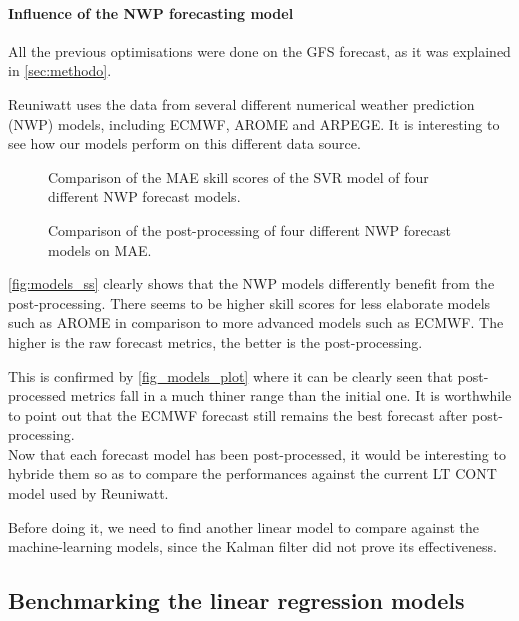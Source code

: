 \paragraph{Influence of the NWP forecasting model}
All the previous optimisations were done on the GFS forecast, as it was explained in \autoref{sec:methodo}.

Reuniwatt uses the data from several different numerical weather prediction (NWP) models, including ECMWF, AROME and ARPEGE.
It is interesting to see how our models perform on this different data source.
\begin{figure}[htb!]
    \centering
    
    \caption{Comparison of the MAE skill scores of the SVR model of four different NWP forecast models.}
    \label{fig:models_ss}   
\end{figure}

\begin{figure}[htb!]
    \centering
    
\caption{Comparison of the post-processing of four different NWP forecast models on MAE.}
\label{fig:models_plot}
\end{figure}

\autoref{fig:models_ss} clearly shows that the NWP models differently benefit from the post-processing.
There seems to be higher skill scores for less elaborate models such as AROME in comparison to more advanced models such as ECMWF. The higher is the raw forecast metrics, the better is the post-processing.

This is confirmed by \autoref{fig_models_plot} where it can be clearly seen that post-processed metrics fall in a much thiner range than the initial one. It is worthwhile to point out that the ECMWF forecast still remains the best forecast after post-processing.\\

Now that each forecast model has been post-processed, it would be interesting to hybride them so as to compare the performances against the current LT CONT model used by Reuniwatt.

Before doing it, we need to find another linear model to compare against the machine-learning models, since the Kalman filter did not prove its effectiveness.
\subsection{Benchmarking the linear regression models}

